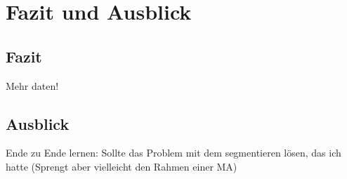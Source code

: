 \chapter{Fazit und Ausblick}


\section{Fazit}


Mehr daten!

\section{Ausblick}


Ende zu Ende lernen: Sollte das Problem mit dem segmentieren lösen, das ich hatte
(Sprengt aber vielleicht den Rahmen einer MA)